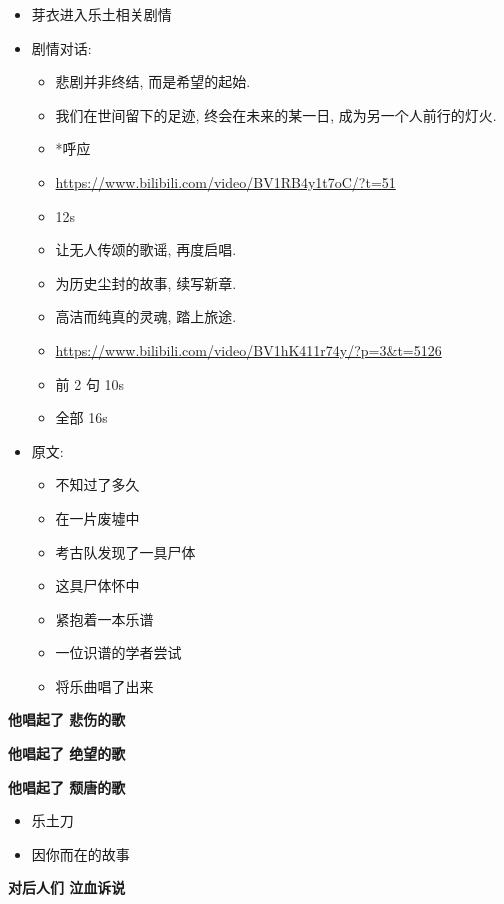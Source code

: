 \documentclass[a4paper]{article}
\begin{document}
\begin{itemize}
    \item 芽衣进入乐土相关剧情
    \item 剧情对话:
    \begin{itemize}
        \item 悲剧并非终结, 而是希望的起始.
        \item 我们在世间留下的足迹, 终会在未来的某一日, 成为另一个人前行的灯火.
        \item *呼应
        \item \url{https://www.bilibili.com/video/BV1RB4y1t7oC/?t=51}
        \item 12s
    \end{itemize}
    \begin{itemize}
        \item 让无人传颂的歌谣, 再度启唱.
        \item 为历史尘封的故事, 续写新章.
        \item 高洁而纯真的灵魂, 踏上旅途.
        \item \url{https://www.bilibili.com/video/BV1hK411r74y/?p=3&t=5126}
        \item 前 2 句 10s
        \item 全部 16s
    \end{itemize}
    \item 原文:
    \begin{itemize}
        \item 不知过了多久
        \item 在一片废墟中
        \item 考古队发现了一具尸体
        \item 这具尸体怀中
        \item 紧抱着一本乐谱
        \item 一位识谱的学者尝试
        \item 将乐曲唱了出来
    \end{itemize}
\end{itemize}

\textbf{他唱起了 悲伤的歌}

\textbf{他唱起了 绝望的歌}

\textbf{他唱起了 颓唐的歌}

\begin{itemize}
    \item 乐土刀
    \item 因你而在的故事
\end{itemize}

\textbf{对后人们 泣血诉说}
\end{document}
